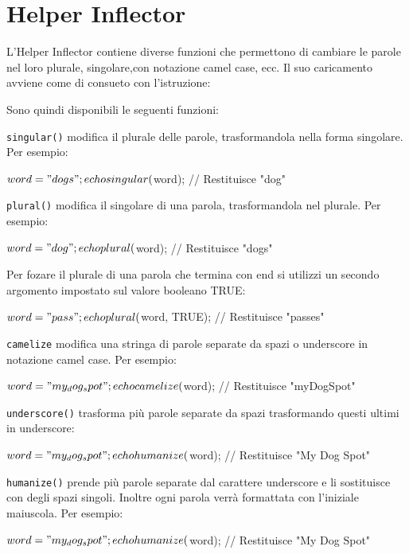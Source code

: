 \section{Helper Inflector}
\label{helper:inflector}

L'Helper Inflector contiene diverse funzioni che permettono di cambiare le parole nel loro plurale, singolare,con notazione camel case, ecc. Il suo caricamento avviene come di consueto con l'istruzione:


Sono quindi disponibili le seguenti funzioni:

\verb|singular()| modifica il plurale delle parole, trasformandola nella forma singolare. Per esempio:

\begin{code}
$word = "dogs";
echo singular($word); // Restituisce "dog"
\end{code}

\verb|plural()| modifica il singolare di una parola, trasformandola nel plurale. Per esempio:

\begin{code}
$word = "dog";
echo plural($word); // Restituisce "dogs"
\end{code}

Per fozare il plurale di una parola che termina con end si utilizzi un secondo argomento impostato sul valore booleano TRUE:

\begin{code}
$word = "pass";
echo plural($word, TRUE); // Restituisce "passes"
\end{code}

\verb|camelize| modifica una stringa di parole separate da spazi o underscore in notazione camel case. Per esempio:

\begin{code}
$word = "my_dog_spot";
echo camelize($word); // Restituisce "myDogSpot"
\end{code}

\verb|underscore()| trasforma più parole separate da spazi trasformando questi ultimi in underscore:

\begin{code}
$word = "my_dog_spot";
echo humanize($word); // Restituisce "My Dog Spot"
\end{code}

\verb|humanize()| prende più parole separate dal carattere underscore e li sostituisce con degli spazi singoli. Inoltre ogni parola verrà formattata con l'iniziale maiuscola. Per esempio:

\begin{code}
$word = "my_dog_spot";
echo humanize($word); // Restituisce "My Dog Spot"
\end{code}